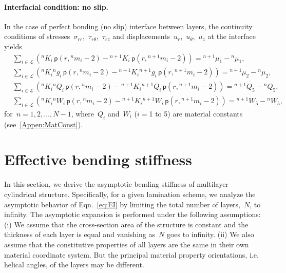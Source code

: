 \documentclass[preprint,10pt,times]{elsarticle}
\numberwithin{equation}{section}
\newcommand{\pr}[1]{\left( #1 \right)}
\newcommand{\p}{\,\mathsf{p}}
\renewcommand{\>}{$\Rightarrow$}
\begin{document}
\paragraph{Interfacial condition: no slip.}

In the case of perfect bonding (no slip) interface between layers, the continuity conditions of stresses~$\sigma_{rr}$,~$\tau_{r\theta}$,~$\tau_{rz}$ and displacements~$u_{r}$,~$u_{\theta}$,~$u_z$ at the interface yields
\begin{subequations}
	\begin{align}
	& \sum_{i \in \mathcal{L}} \left( {}^{n}\!{K_{i}} \p\pr{r,{}^{n}\!{m_{i}} - 2} - {}^{n+1}\!{K_{i}} \p\pr{r,{}^{n+1}\!{m_{i}} - 2} \right) = {}^{n+1}\!{\mu_{1}}
  - {}^{n}\!{\mu_{1}}, \\
	& \sum_{i \in \mathcal{L}} \left( {}^{n}\!{K_{i}} {}^{n}\!{g_{i}} \p\pr{r,{}^{n}\!{m_{i}} - 2} - {}^{n+1}\!{K_{i}} {}^{n+1}\!{g_{i}} \p\pr{r,{}^{n+1}\!{m_{i}} - 2} \right) = {}^{n+1}\!{\mu_{2}} - {}^{n}\!{\mu_{2}}, \\
	& \sum_{i \in \mathcal{L}} \left( {}^{n}\!{K_{i}} {}^{n}\!{Q_{i}} \p\pr{r,{}^{n}\!{m_{i}} - 2} - {}^{n+1}\!{K_{i}} {}^{n+1}\!{Q_{i}} \p\pr{r,{}^{n+1}\!{m_{i}} - 2} \right) = {}^{n+1}\!{Q_{5}} - {}^{n}\!{Q_{5}}, \\
	& \sum_{i \in \mathcal{L}} \left( {}^{n}\!{K_{i}} {}^{n}\!{W_{i}} \p\pr{r,{}^{n}\!{m_{i}} - 2} - {}^{n+1}\!{K_{i}} {}^{n+1}\!{W_{i}} \p\pr{r,{}^{n+1}\!{m_{i}} - 2} \right) = {}^{n+1}\!{W_{5}} - {}^{n}\!{W_{5}},
	\end{align}
	\label{eq:noslip_interface}
\end{subequations}
for~$n = 1,2,\dots,N-1$, where~$Q_i$ and~$W_i$ ($i=$1 to 5) are material constants (see~\ref{Appen:MatConst}).





\section{Effective bending stiffness}
\label{sec:limit_analysis}
In this section, we derive the asymptotic bending stiffness of multilayer cylindrical structure.
Specifically, for a given lamination scheme, we analyze the asymptotic behavior of Eqn.~\eqref{eq:EI} by limiting the total number of layers,~$N$, to infinity.
The asymptotic expansion is performed under the following assumptions: (i) We assume that the cross-section area of the structure is constant and the thickness of each layer is equal and vanishing as~$N$ goes to infinity. (ii) We also assume that the constitutive properties of all layers are the same in their own material coordinate system. But the principal material property orientations, i.e. helical angles, of the layers may be different.
\end{document}
